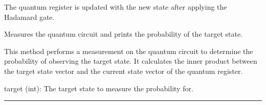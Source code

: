 \documentclass[letterpaper,10pt,english]{sphinxmanual}
\begin{document}
\begin{fulllineitems}
\begin{fulllineitems}
\sphinxAtStartPar
The quantum register is updated with the new state after applying the
Hadamard gate.

\end{fulllineitems}


\begin{fulllineitems}
\label{\detokenize{index:qc.Circuit.measure}}
\pysigstartsignatures
{}
\pysigstopsignatures
\sphinxAtStartPar
Measures the quantum circuit and prints the probability of the target state.

\sphinxAtStartPar
This method performs a measurement on the quantum circuit to determine the
probability of observing the target state. It calculates the inner product
between the target state vector and the current state vector of the quantum
register.
\begin{description}
\sphinxAtStartPar
target (int): The target state to measure the probability for.

\end{description}

\end{fulllineitems}


\end{fulllineitems}



\bigskip\hrule\bigskip

\label{\detokenize{index:module-utils.state_vector}}
\end{document}
